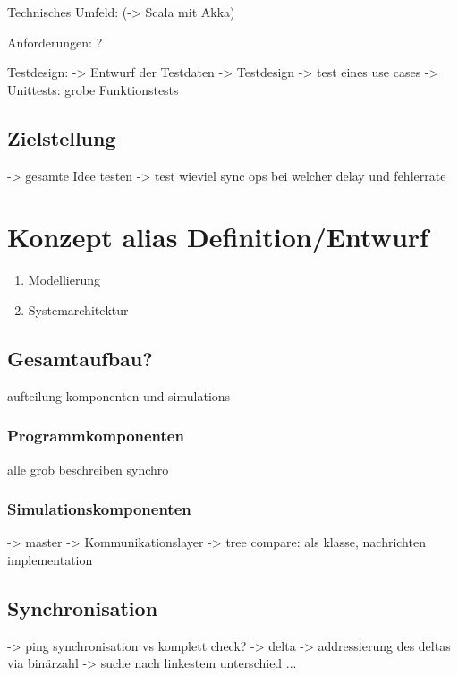 \documentclass[a4paper,11pt,oneside,%
headsepline,												%
footsepline,												%
bibtotocnumbered									%
]{scrreprt}
\begin{document}
Technisches Umfeld:
(-> Scala mit Akka)

Anforderungen:
?

Testdesign:
-> Entwurf der Testdaten
-> Testdesign -> test eines use cases
-> Unittests: grobe Funktionstests 

\section{Zielstellung}
-> gesamte Idee testen
-> test wieviel sync ops bei welcher delay und fehlerrate
\chapter{Konzept alias Definition/Entwurf}

		\begin{enumerate}[1.]
			\item Modellierung
			\item Systemarchitektur
		\end{enumerate}
\section{Gesamtaufbau?}

aufteilung komponenten und simulations
\subsection{Programmkomponenten}
 alle grob beschreiben
synchro






\subsection{Simulationskomponenten}	
-> master
-> Kommunikationslayer
-> tree compare: als klasse, nachrichten implementation	
		
\section{Synchronisation}
-> ping synchronisation vs komplett check?
-> delta
-> addressierung des deltas via binärzahl
-> suche nach linkestem unterschied ...
\end{document}
